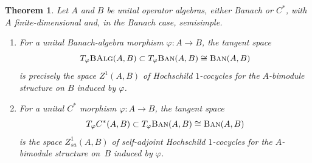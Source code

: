 \documentclass[10pt,a4paper]{amsart}
\numberwithin{equation}{section}
\newtheorem{Theorem}{Theorem}[section]
\newcommand{\cat}[1]{\text{\sc #1}}
\begin{document}
\begin{Theorem}\label{th:tgsp}
 Let $A$ and $B$ be unital operator algebras, either Banach or $C^*$, with $A$ finite-dimensional and, in the Banach case, semisimple.
 \begin{enumerate}[$(1)$]\itemsep=0pt
 \item\label{item:bantg} For a unital Banach-algebra morphism $\varphi\colon A\to B$, the tangent space
 \begin{equation}\label{eq:tgban}
 T_{\varphi}\cat{BAlg}(A,B)\subset T_{\varphi}\cat{Ban}(A,B)\cong \cat{Ban}(A,B)
 \end{equation}
 is precisely the space $Z^1(A,B)$ of Hochschild $1$-cocycles for the $A$-bimodule structure on $B$ induced by $\varphi$.

\item\label{item:casttg} For a unital $C^*$ morphism $\varphi\colon A\to B$, the tangent space
 \begin{equation*}
 T_{\varphi}C^*(A,B)\subset T_{\varphi}\cat{Ban}(A,B)\cong \cat{Ban}(A,B)
 \end{equation*}
 is the space $Z_{sa}^1(A,B)$ of self-adjoint Hochschild $1$-cocycles for the $A$-bimodule structure on~$B$ induced by $\varphi$.
\end{enumerate}
\end{Theorem}
\end{document}
